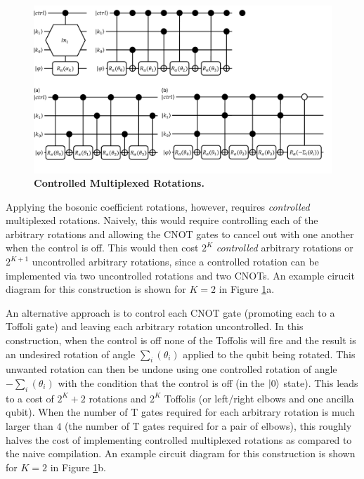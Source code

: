 \begin{figure}
    \centering
    \includegraphics[width=16cm]{figures/controlled-multiplexed-rotations.pdf}
    \caption{
        \textbf{Controlled Multiplexed Rotations.} 
    }
    \label{fig:controlled-multiplexed-rotations}
\end{figure}

Applying the bosonic coefficient rotations, however, requires \textit{controlled} multiplexed rotations.
Naively, this would require controlling each of the arbitrary rotations and allowing the CNOT gates to cancel out with one another when the control is off.
This would then cost $2^K$ \textit{controlled} arbitrary rotations or $2^{K+1}$ uncontrolled arbitrary rotations, since a controlled rotation can be implemented via two uncontrolled rotations and two CNOTs.
An example cirucit diagram for this construction is shown for $K = 2$ in Figure \ref{fig:controlled-multiplexed-rotations}a.

An alternative approach is to control each CNOT gate (promoting each to a Toffoli gate) and leaving each arbitrary rotation uncontrolled.
In this construction, when the control is off none of the Toffolis will fire and the result is an undesired rotation of angle $\sum_{i} (\theta_i)$ applied to the qubit being rotated.
This unwanted rotation can then be undone using one controlled rotation of angle $- \sum_{i} (\theta_i)$ with the condition that the control is off (in the $\ket{0}$ state).
This leads to a cost of $2^K + 2$ rotations and $2^K$ Toffolis (or left/right elbows and one ancilla qubit).
When the number of T gates required for each arbitrary rotation is much larger than $4$ (the number of T gates required for a pair of elbows), this roughly halves the cost of implementing controlled multiplexed rotations as compared to the naive compilation.
An example circuit diagram for this construction is shown for $K = 2$ in Figure \ref{fig:controlled-multiplexed-rotations}b.